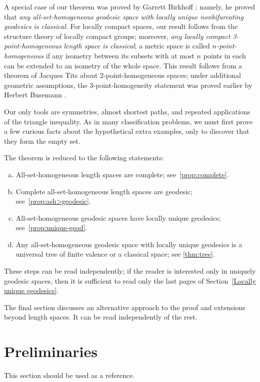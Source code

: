 \documentclass[a4paper,10pt]{article}
\begin{document}
A special case of our theorem was proved by Garrett Birkhoff \cite{birkhoff};
namely, he proved that \textit{any all-set-homogeneous geodesic space with locally unique nonbifurcating geodesics is classical}.
For locally compact spaces, our result follows from the structure theory of locally compact groups; moreover, \textit{any locally compact 3-point-homogeneous length space is classical};
a metric space is called \emph{$n$-point-homogeneous} if any isometry between its subsets with at most $n$ points in each can be extended to an isometry of the whole space.
This result follows from a theorem of Jacques Tits \cite{tits} about 2-point-homogeneous spaces;
under additional geometric assumptions, the 3-point-homogeneity statement was proved earlier by Herbert Busemann \cite[V §9]{busemann}.

Our only tools are symmetries, almost shortest paths, and repeated applications of the triangle inequality.
As in many classification problems, we must first prove a few curious facts about the hypothetical extra examples, only to discover that they form the empty set.

The theorem is reduced to the following statements:
\begin{enumerate}[(a)]
\item All-set-homogeneous length spaces are complete; see~\ref{prop:complete}.
\item Complete all-set-homogeneous length spaces are geodesic; see~\ref{prop:ash>geodesic}.
\item All-set-homogeneous geodesic spaces have locally unique geodesics; see~\ref{prop:unique-geod}.
\item Any all-set-homogeneous geodesic space with locally unique geodesics is a universal tree of finite valence or a classical space; see \ref{thm:tree}.
\end{enumerate}
These steps can be read independently; if the reader is interested only in uniquely geodesic spaces, then it is sufficient to read only the last pages of Section~\ref{Locally unique geodesics}.

The final section discusses an alternative approach to the proof and extensions beyond length spaces.
It can be read independently of the rest.

\section{Preliminaries}

This section should be used as a reference.
\end{document}
